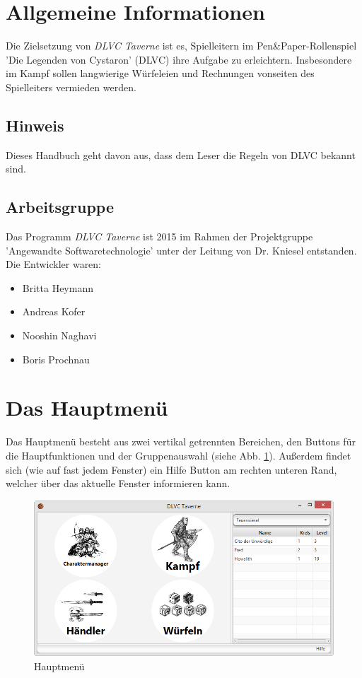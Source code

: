 \documentclass[11pt, a4paper, german]{article}
\begin{document}

\clearpage

\tableofcontents
\pagebreak
\section{Allgemeine Informationen}
Die Zielsetzung von \textit{DLVC Taverne} ist es, Spielleitern im Pen\&Paper-Rollenspiel 'Die Legenden von Cystaron' (DLVC) ihre Aufgabe zu erleichtern. Insbesondere im Kampf sollen langwierige Würfeleien und Rechnungen vonseiten des Spielleiters vermieden werden.
\subsection{Hinweis}
Dieses Handbuch geht davon aus, dass dem Leser die Regeln von DLVC bekannt sind. 
\subsection{Arbeitsgruppe}
Das Programm \textit{DLVC Taverne} ist 2015 im Rahmen der Projektgruppe 'Angewandte Softwaretechnologie' unter der Leitung von Dr. Kniesel entstanden. Die Entwickler waren:
\begin{itemize}
	\item[] Britta Heymann
	\item[] Andreas Kofer
	\item[] Nooshin Naghavi
	\item[] Boris Prochnau
\end{itemize}

\newpage
\section{Das Hauptmenü}
Das Hauptmenü besteht aus zwei vertikal getrennten Bereichen, den Buttons für die Hauptfunktionen und der Gruppenauswahl (siehe Abb. \ref{fig:Hauptmenue1}). Außerdem findet sich (wie auf fast jedem Fenster) ein Hilfe Button am rechten unteren Rand, welcher über das aktuelle Fenster informieren kann.
\begin{figure}
\centering
\includegraphics[width=1\linewidth]{Bilder/Hauptmenue1}
\caption{Hauptmenü}
\label{fig:Hauptmenue1}
\end{figure}
\end{document}
